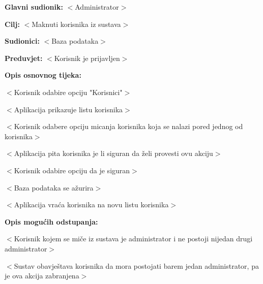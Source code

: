 					\noindent {}
					\begin{packed_item}

						\item \textbf{Glavni sudionik: }$<$Administrator$>$
						\item  \textbf{Cilj:} $<$Maknuti korisnika iz sustava$>$
						\item  \textbf{Sudionici:} $<$Baza podataka$>$
						\item  \textbf{Preduvjet:} $<$Korisnik je prijavljen$>$
						\item  \textbf{Opis osnovnog tijeka:}

						\item[] \begin{packed_enum}

							\item $<$Korisnik odabire opciju "Korisnici"$>$
							\item $<$Aplikacija prikazuje listu korisnika$>$
							\item $<$Korisnik odabere opciju micanja korisnika koja se nalazi pored jednog od korisnika$>$
							\item $<$Aplikacija pita korisnika je li siguran da želi provesti ovu akciju$>$
							\item $<$Korisnik odabire opciju da je siguran$>$
							\item $<$Baza podataka se ažurira$>$
							\item $<$Aplikacija vraća korisnika na novu listu korisnika$>$

						\end{packed_enum}

						\item  \textbf{Opis mogućih odstupanja:}

						\item[] \begin{packed_item}

							\item[3.a] $<$Korisnik kojem se miče iz sustava je administrator i ne postoji nijedan
							drugi administrator$>$
							\item[] \begin{packed_enum}

								\item $<$Sustav obavještava korisnika da mora postojati
								barem jedan administrator, pa je ova akcija zabranjena$>$

							\end{packed_enum}

						\end{packed_item}
					\end{packed_item}


